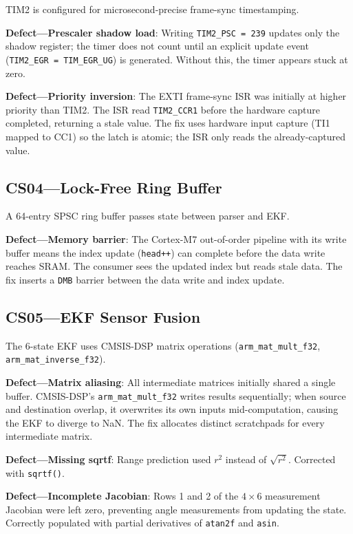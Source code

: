 \documentclass[conference,a4paper]{IEEEtran}
\begin{document}
TIM2 is configured for microsecond-precise frame-sync timestamping.

\textbf{Defect---Prescaler shadow load}: Writing \texttt{TIM2\_PSC = 239} updates only the shadow register; the timer does not count until an explicit update event (\texttt{TIM2\_EGR = TIM\_EGR\_UG}) is generated. Without this, the timer appears stuck at zero.

\textbf{Defect---Priority inversion}: The EXTI frame-sync ISR was initially at higher priority than TIM2. The ISR read \texttt{TIM2\_CCR1} before the hardware capture completed, returning a stale value. The fix uses hardware input capture (TI1 mapped to CC1) so the latch is atomic; the ISR only reads the already-captured value.

\subsection{CS04---Lock-Free Ring Buffer}

A 64-entry SPSC ring buffer passes state between parser and EKF.

\textbf{Defect---Memory barrier}: The Cortex-M7 out-of-order pipeline with its write buffer means the index update (\texttt{head++}) can complete before the data write reaches SRAM. The consumer sees the updated index but reads stale data. The fix inserts a \texttt{DMB} barrier between the data write and index update.

\subsection{CS05---EKF Sensor Fusion}

The 6-state EKF uses CMSIS-DSP matrix operations (\texttt{arm\_mat\_mult\_f32}, \texttt{arm\_mat\_inverse\_f32}).

\textbf{Defect---Matrix aliasing}: All intermediate matrices initially shared a single buffer. CMSIS-DSP's \texttt{arm\_mat\_mult\_f32} writes results sequentially; when source and destination overlap, it overwrites its own inputs mid-computation, causing the EKF to diverge to NaN. The fix allocates distinct scratchpads for every intermediate matrix.

\textbf{Defect---Missing sqrtf}: Range prediction used $r^2$ instead of $\sqrt{r^2}$. Corrected with \texttt{sqrtf()}.

\textbf{Defect---Incomplete Jacobian}: Rows 1 and 2 of the $4\times6$ measurement Jacobian were left zero, preventing angle measurements from updating the state. Correctly populated with partial derivatives of \texttt{atan2f} and \texttt{asin}.
\end{document}
